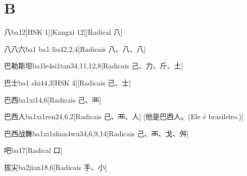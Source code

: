 
\section*{B}

\begin{entry}{八}{ba1}{2}[HSK 1][Kangxi 12][Radical ⼋]
\end{entry}

\begin{entry}{八八六}{ba1 ba1 liu4}{2,2,4}[Radicais ⼋、⼋、⼋]
\end{entry}

\begin{entry}{巴勒斯坦}{ba1le4si1tan3}{4,11,12,8}[Radicais ⼰、⼒、⽄、⼟]
\end{entry}

\begin{entry}{巴士}{ba1 shi4}{4,3}[HSK 4][Radicais ⼰、⼠]
\end{entry}

\begin{entry}{巴西}{ba1xi1}{4,6}[Radicais ⼰、⾑]
\end{entry}

\begin{entry}{巴西人}{ba1xi1ren2}{4,6,2}[Radicais ⼰、⾑、⼈]
  [他是巴西人。(Ele é brasileiro.)]
\end{entry}

\begin{entry}{巴西战舞}{ba1xi1zhan4wu3}{4,6,9,14}[Radicais ⼰、⾑、⼽、⾇]
\end{entry}

\begin{entry}{吧}{ba1}{7}[Radical ⼝]
\end{entry}

\begin{entry}{拔尖}{ba2jian1}{8,6}[Radicais ⼿、⼩]
\end{entry}

